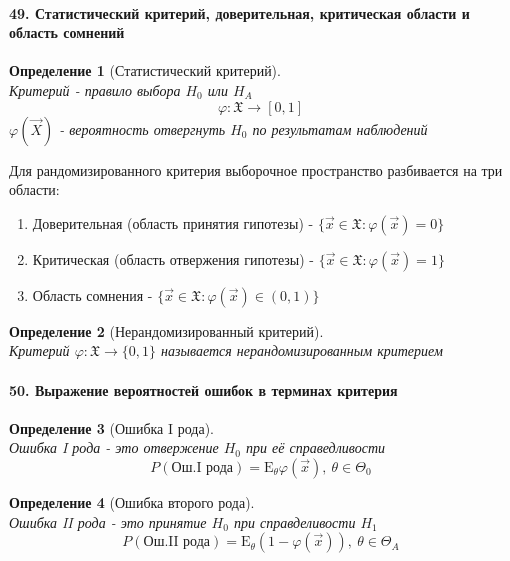 \documentclass[titlepage]{article}
\newcommand{\sX}{\mathfrak{X}}
\newcommand{\sE}{\mathrm{E}}
\newtheorem{definition}{Определение}
\begin{document}
\paragraph{49. Статистический критерий, доверительная, критическая области и область сомнений}
\begin{definition}[Статистический критерий] ~\\
	Критерий - правило выбора $H_0$ или $H_A$
	\[\varphi: \sX \rightarrow [0,1]\]
	$\varphi(\vec X)$ - вероятность отвергнуть $H_0$ по результатам наблюдений
\end{definition}
Для рандомизированного критерия выборочное пространство разбивается на три области:
\begin{enumerate}
	\item Доверительная (область принятия гипотезы) - $\{\vec x \in \sX: \varphi(\vec x) = 0\}$
	\item Критическая (область отвержения гипотезы) - $\{\vec x \in \sX: \varphi(\vec x) = 1\}$
	\item Область сомнения - $\{\vec x \in \sX: \varphi(\vec x) \in (0,1)\}$
\end{enumerate}
\begin{definition}[Нерандомизированный критерий] ~\\
	Критерий $\varphi: \sX \rightarrow \{0,1\}$ называется нерандомизированным критерием
\end{definition}

\paragraph{50. Выражение вероятностей ошибок в терминах критерия}
\begin{definition}[Ошибка I рода] ~\\
	Ошибка I рода - это отвержение $H_0$ при её справедливости
	\[P(\text{Ош.I рода}) = \sE_\theta\varphi(\vec x),\ \theta \in \Theta_0\]
\end{definition}
\begin{definition}[Ошибка второго рода] ~\\
	Ошибка II рода - это принятие $H_0$ при справделивости $H_1$
	\[P(\text{Ош.II рода}) = \sE_\theta(1-\varphi(\vec x)),\ \theta \in \Theta_A\]
\end{definition}
\end{document}
